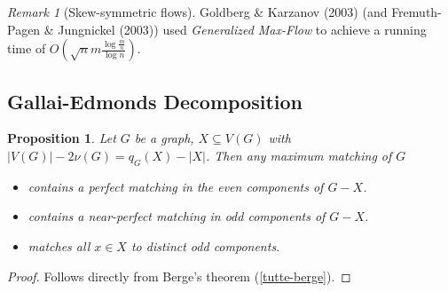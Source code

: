 \documentclass[11pt, a4paper]{article}
\newcommand{\abs}[1]{\left\lvert#1\right\rvert}
\newtheorem{prop}[theorem]{Proposition}
\theoremstyle{remark}
\newtheorem{remark}[theorem]{Remark}
\theoremstyle{definition}
\begin{document}
\begin{remark}[Skew-symmetric flows]
	Goldberg \& Karzanov (2003) (and Fremuth-Pagen \& Jungnickel (2003))
	used \emph{Generalized Max-Flow} to achieve a running time of
	$O(\sqrt{n}m\frac{\log\frac{m}{n}}{\log n})$.
\end{remark}

\subsection{Gallai-Edmonds Decomposition}

\begin{prop}\label{prop:gallai-edmonds}
	Let $G$ be a graph, $X\subseteq V(G)$ with $\abs{V(G)}-2\nu(G)=q_G(X)
		-\abs{X}$. Then any maximum matching of $G$
	\begin{itemize}
		\item contains a perfect matching in the even components of $G-X$.
		\item contains a near-perfect matching in odd components of $G-X$.
		\item matches all $x\in X$ to distinct odd components.
	\end{itemize}
\end{prop}
\begin{proof}
	Follows directly from Berge's theorem (\ref{tutte-berge}).
\end{proof}
\end{document}
